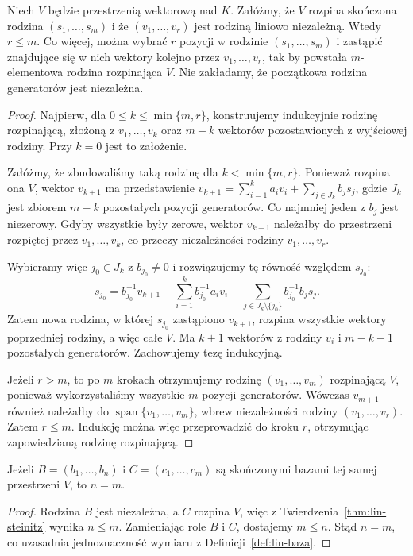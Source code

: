 \begin{twierdzenie}
\label{thm:lin-steinitz}
Niech \(V\) będzie przestrzenią wektorową nad \(K\).
Załóżmy, że \(V\) rozpina skończona rodzina
\((s_1,\ldots,s_m)\) i że
\((v_1,\ldots,v_r)\) jest rodziną liniowo niezależną.
Wtedy \(r\leq m\). Co więcej, można wybrać
\(r\) pozycji w rodzinie \((s_1,\ldots,s_m)\)
i zastąpić znajdujące się w nich wektory kolejno
przez \(v_1,\ldots,v_r\), tak by powstała
\(m\)-elementowa rodzina rozpinająca \(V\).
Nie zakładamy, że początkowa rodzina generatorów
jest niezależna.
\end{twierdzenie}
\begin{proof}
Najpierw, dla \(0\leq k\leq\min\{m,r\}\),
konstruujemy indukcyjnie rodzinę rozpinającą, złożoną
z \(v_1,\ldots,v_k\) oraz \(m-k\)
wektorów pozostawionych z wyjściowej rodziny.
Przy \(k=0\) jest to założenie.

Załóżmy, że zbudowaliśmy taką rodzinę
dla \(k<\min\{m,r\}\).
Ponieważ rozpina ona \(V\), wektor \(v_{k+1}\)
ma przedstawienie
\(v_{k+1}=\sum_{i=1}^{k}a_iv_i+
                 \sum_{j\in J_k}b_js_j\),
gdzie \(J_k\) jest zbiorem \(m-k\)
pozostałych pozycji generatorów.
Co najmniej jeden z \(b_j\) jest niezerowy.
Gdyby wszystkie były zerowe, wektor \(v_{k+1}\)
należałby do przestrzeni rozpiętej przez
\(v_1,\ldots,v_k\), co przeczy niezależności
rodziny \(v_1,\ldots,v_r\).

Wybieramy więc \(j_0\in J_k\) z
\(b_{j_0}\neq0\) i rozwiązujemy tę równość
względem \(s_{j_0}\):
\[
 s_{j_0}=b_{j_0}^{-1}v_{k+1}
   -\sum_{i=1}^{k}b_{j_0}^{-1}a_iv_i
   -\sum_{j\in J_k\setminus\{j_0\}}
                       b_{j_0}^{-1}b_js_j .
\]
Zatem nowa rodzina, w której \(s_{j_0}\)
zastąpiono \(v_{k+1}\), rozpina wszystkie
wektory poprzedniej rodziny, a więc całe \(V\).
Ma \(k+1\) wektorów z rodziny \(v_i\)
i \(m-k-1\) pozostałych generatorów.
Zachowujemy tezę indukcyjną.

Jeżeli \(r>m\), to po \(m\) krokach
otrzymujemy rodzinę \((v_1,\ldots,v_m)\)
rozpinającą \(V\), ponieważ wykorzystaliśmy
wszystkie \(m\) pozycji generatorów.
Wówczas \(v_{m+1}\) również należałby
do \(\operatorname{span}\{v_1,\ldots,v_m\}\),
wbrew niezależności rodziny \((v_1,\ldots,v_r)\).
Zatem \(r\leq m\). Indukcję można więc
przeprowadzić do kroku \(r\), otrzymując
zapowiedzianą rodzinę rozpinającą.
\end{proof}

\begin{wniosek}
\label{cor:lin-bazy-rowna-liczba}
Jeżeli \(B=(b_1,\ldots,b_n)\) i
\(C=(c_1,\ldots,c_m)\) są skończonymi bazami
tej samej przestrzeni \(V\), to \(n=m\).
\end{wniosek}
\begin{proof}
Rodzina \(B\) jest niezależna, a \(C\) rozpina \(V\),
więc z Twierdzenia~\ref{thm:lin-steinitz}
wynika \(n\leq m\).
Zamieniając role \(B\) i \(C\), dostajemy \(m\leq n\).
Stąd \(n=m\), co uzasadnia jednoznaczność
wymiaru z Definicji~\ref{def:lin-baza}.
\end{proof}

